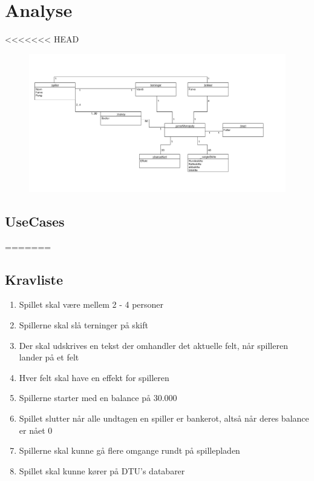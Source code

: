 \section{Analyse}
<<<<<<< HEAD
\begin{figure}[h]
	\begin{center}
		\includegraphics[scale=0.9]{fig/dtu/domainmodel.jpg}
	\end{center}
\end{figure}
	\subsection{UseCases}
=======
\subsection{Kravliste}
\begin{enumerate}
\item Spillet skal være mellem 2 - 4 personer
\item Spillerne skal slå terninger på skift
\item Der skal udskrives en tekst der omhandler det aktuelle felt, når spilleren lander på et felt
\item Hver felt skal have en effekt for spilleren
\item Spillerne starter med en balance på 30.000
\item Spillet slutter når alle undtagen en spiller er bankerot, altså når deres balance er nået 0
\item Spillerne skal kunne gå flere omgange rundt på spillepladen
\item Spillet skal kunne kører på DTU’s databarer
\end{enumerate}


